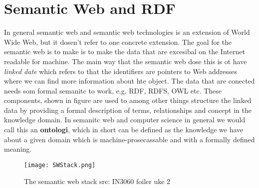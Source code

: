 \section{Semantic Web and RDF}
In general semantic web and semantic web technologies is an extension of World Wide Web,
but it dosen't refer to one concrete extension. The goal for the semantic web is to make is to 
make the data that are excesibal on the Internet readable for machine. The main way that the semantic web 
dose this is ot have \textit{linked date} which refers to that the identifiers are pointers to Web addresses 
where we can find more information about hte object.
The data that are conected needs som formal semanitc to work, e.g. RDF, RDFS, OWL etc. These components, shown in figure 
are used to among other things structure the linked data by providing a formal description
of terms, relationships and concept in the knowledge domain. In semanitc web and computer science in general 
we would call this an \textbf{ontologi}, which in short can be defined as the knowledge we have about a given 
domain which is machine-prosecassable and with a formally defined meaning.

\begin{figure}
    \centering
    \texttt{[image: SWStack.png]}
    \caption{The semantic web stack src: IN3060 foiler uke 2}
    \label{fig:SW stack}
\end{figure}


